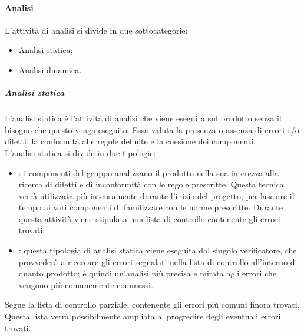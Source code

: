 \documentclass[../norme-di-progetto.tex]{subfiles}
\begin{document}
\paragraph{Analisi}
L'attività di analisi si divide in due sottocategorie:
\begin{itemize}
  \item Analisi statica;
  \item Analisi dinamica.
\end{itemize}
\subparagraph{Analisi statica}
L'analisi statica è l'attività di analisi che viene eseguita sul prodotto senza il bisogno che questo venga eseguito. Essa valuta la presenza o assenza di errori e/o difetti, la conformità alle regole definite e la coesione dei componenti. \\
L'analisi statica si divide in due tipologie:
\begin{itemize}
  \item \textbf{}: i componenti del gruppo analizzano il prodotto nella sua interezza alla ricerca di difetti e di inconformità con le regole prescritte. Questa tecnica verrà utilizzata più intensamente durante l'inizio del progetto, per lasciare il tempo ai vari componenti di familizzare con le norme prescritte. Durante questa attività viene stipulata una lista di controllo contenente gli errori trovati;
  \item \textbf{}: questa tipologia di analisi statica viene eseguita dal singolo verificatore, che provvederà a ricercare gli errori segnalati nella lista di controllo all'interno di quanto prodotto; è quindi un'analisi più precisa e mirata agli errori che vengono più comunemente commessi.
\end{itemize}
Segue la lista di controllo parziale, contenente gli errori più comuni finora trovati. Questa lista verrà possibilmente ampliata al progredire degli eventuali errori trovati.
\end{document}
